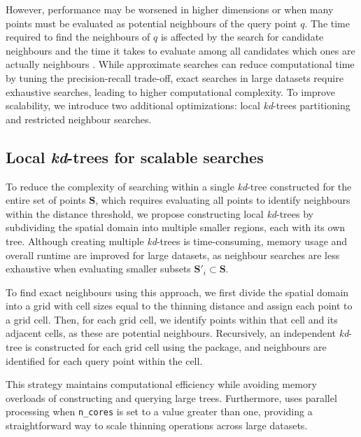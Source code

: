 However, performance may be worsened in higher dimensions or when many points must be evaluated as potential neighbours of the query point \(q\). The time required to find the neighbours of \(q\) is affected by the search for candidate neighbours and the time it takes to evaluate among all candidates which ones are actually neighbours \citep{ram2019revisiting}. While approximate searches can reduce computational time by tuning the precision-recall trade-off, exact searches in large datasets require exhaustive searches, leading to higher computational complexity. To improve scalability, we introduce two additional optimizations: local \emph{kd}-trees partitioning and restricted neighbour searches.

\subsection{\texorpdfstring{Local \emph{kd}-trees for scalable searches}{Local kd-trees for scalable searches}}\label{local-kd-trees-for-scalable-searches}

To reduce the complexity of searching within a single \emph{kd}-tree constructed for the entire set of points \(\mathbf{S}\), which requires evaluating all points to identify neighbours within the distance threshold, we propose constructing local \emph{kd}-trees by subdividing the spatial domain into multiple smaller regions, each with its own tree. Although creating multiple \emph{kd}-trees is time-consuming, memory usage and overall runtime are improved for large datasets, as neighbour searches are less exhaustive when evaluating smaller subsets \(\mathbf{S}'_i \subset \mathbf{S}\).

To find exact neighbours using this approach, we first divide the spatial domain into a grid with cell sizes equal to the thinning distance and assign each point to a grid cell. Then, for each grid cell, we identify points within that cell and its adjacent cells, as these are potential neighbours. Recursively, an independent \emph{kd}-tree is constructed for each grid cell using the  package, and neighbours are identified for each query point within the cell.

This strategy maintains computational efficiency while avoiding memory overloads of constructing and querying large trees. Furthermore,  uses parallel processing when \texttt{n\_cores} is set to a value greater than one, providing a straightforward way to scale thinning operations across large datasets.

